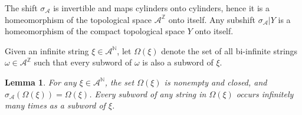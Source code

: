 \documentclass[12pt]{article}
\newtheorem{lemma}[theorem]{Lemma}
\theoremstyle{definition}
\def\bN{\mathbb{N}}
\def\bZ{\mathbb{Z}}
\def\cA{\mathcal{A}}
\def\om{\omega}
\def\si{\sigma}
\begin{document}
The shift $\si_{\cA}$ is invertible and maps cylinders onto cylinders, 
hence it is a homeomorphism of the topological space $\cA^{\bZ}$ onto 
itself.  Any subshift $\si_{\cA}|Y$ is a homeomorphism of the compact 
topological space $Y$ onto itself.

Given an infinite string $\xi\in\cA^{\bN}$, let $\Omega(\xi)$ denote the 
set of all bi-infinite strings $\om\in\cA^{\bZ}$ such that every subword of 
$\om$ is also a subword of $\xi$.

\begin{lemma}\label{omega-xi}
For any $\xi\in\cA^{\bN}$, the set $\Omega(\xi)$ is nonempty and closed, 
and $\si_{\cA}(\Omega(\xi))=\Omega(\xi)$.  Every subword of any string in 
$\Omega(\xi)$ occurs infinitely many times as a subword of $\xi$.
\end{lemma}
\end{document}
